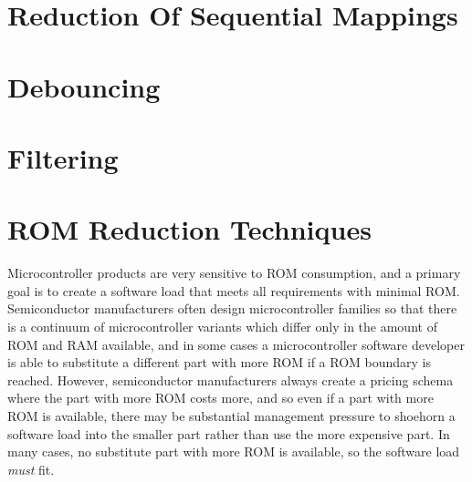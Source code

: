 \section{Reduction Of Sequential Mappings}



\section{Debouncing}



\section{Filtering}



\section{ROM Reduction Techniques}
\label{cpco0:srrs0}

Microcontroller products are very sensitive to ROM consumption, and
a primary goal is to create a software load that meets all requirements
with minimal ROM.  Semiconductor manufacturers often design 
microcontroller families so that there is a continuum of microcontroller
variants which differ only in the amount of ROM and RAM available,
and in some cases a microcontroller software developer is able to 
substitute a different part with more ROM if a ROM boundary is reached.
However, semiconductor manufacturers always create a pricing schema
where the part with more ROM costs more, and so even if a part with
more ROM is available, there may be substantial management pressure to
shoehorn a software load into the smaller part rather than use the
more expensive part. In many cases, no substitute part with more ROM
is available, so the software load \emph{must} fit.

